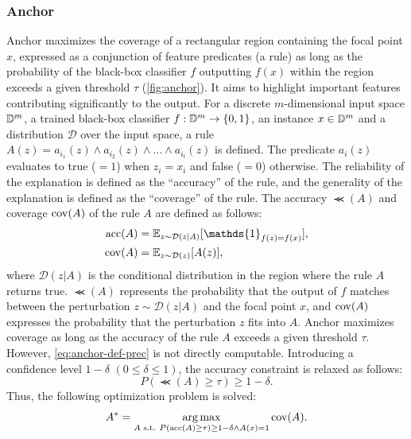 \documentclass[runningheads]{llncs}
\begin{document}
\subsubsection[Anchor]{Anchor~\cite{ribeiro2018anchors}}
Anchor maximizes the coverage of a rectangular region
containing the focal point $x$,
expressed as a conjunction of feature predicates (a rule)
as long as the probability of the black-box classifier $f$
outputting $f(x)$ within the region exceeds a given threshold $\tau$
(\cref{fig:anchor}).
It aims to highlight important features
contributing significantly to the output.
For a discrete $m$-dimensional input space $\mathbb{D}^{m}$,
a trained black-box classifier $f: \mathbb{D}^{m} \to \{0,1\}$,
an instance $x \in \mathbb{D}^{m}$
and a distribution $\mathcal{D}$ over the input space,
a rule $A(z) = a_{i_1}(z) \wedge a_{i_2}(z) \wedge \dots \wedge a_{i_t}(z)$ is defined.
The predicate $a_i(z)$ evaluates to true ($=1$) when $z_i = x_i$ and false ($=0$) otherwise.
The reliability of the explanation is defined as the ``accuracy'' of the rule,
and the generality of the explanation is defined as the ``coverage'' of the rule.
The accuracy $\Prec(A)$ and coverage $\operatorname{cov}(A)$ of the rule $A$ are defined as follows:
\begin{align}
  \Prec(A) & =\mathbb{E}_{z\sim\mathcal{D}(z|A)}
  [\mathds{1}_{f(z)=f(x)}], \label{eq:anchor-def-prec} \\
  \Cov(A)  & =\mathbb{E}_{z\sim\mathcal{D}(z)}[A(z)],
\end{align}
where $\mathcal{D}(z|A)$ is the conditional distribution in the region
where the rule $A$ returns true.
$\Prec(A)$ represents the probability that the output of $f$ matches
between the perturbation $z\sim\mathcal{D}(z|A)$ and the focal point $x$,
and $\operatorname{cov}(A)$ expresses the probability that the perturbation $z$ fits into $A$.
Anchor maximizes coverage as long as
the accuracy of the rule $A$ exceeds a given threshold $\tau$.
However, \cref{eq:anchor-def-prec} is not directly computable.
Introducing a confidence level $1-\delta$ $(0\le\delta\le1)$,
the accuracy constraint is relaxed as follows:
\begin{equation}
  \label{eq:const-prec}
  P(\Prec(A)\ge\tau)\ge1-\delta.
\end{equation}
Thus, the following optimization problem is solved:
\begin{equation}
  \label{eq:main-problem}
  A^*=\underset{A \text{~s.t. } P(\operatorname{acc}(A)\ge\tau)\ge1-\delta\wedge A(x)=1}
  {\arg\max}\operatorname{cov}(A).
\end{equation}
\end{document}
